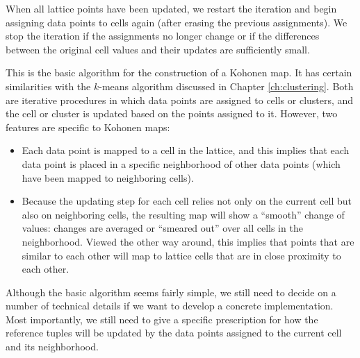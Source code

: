 When all lattice points have been updated, we restart the iteration
and begin assigning data points to cells again (after erasing the
previous assignments). We stop the iteration if the assignments no
longer change or if the differences between the original cell values
and their updates are sufficiently small.

This is the basic algorithm for the construction of a Kohonen map.  It
has certain similarities with the $k$-means algorithm discussed in
Chapter \ref{ch:clustering}. Both are iterative procedures in which
data points are assigned to cells or clusters, and the cell or cluster
is updated based on the points assigned to it.  However, two features
are specific to Kohonen maps:

\begin{itemize}
\item Each data point is mapped to a cell in the lattice, and this
  implies that each data point is placed in a specific neighborhood of
  other data points (which have been mapped to neighboring cells).
\item Because the updating step for each cell relies not only on the
  current cell but also on neighboring cells, the resulting map will
  show a ``smooth'' change of values: changes are averaged or
  ``smeared out'' over all cells in the neighborhood. Viewed the other
  way around, this implies that points that are similar to each other
  will map to lattice cells that are in close proximity to each other.
\end{itemize}

Although the basic algorithm seems fairly simple, we still need to
decide on a number of technical details if we want to develop a
concrete implementation. Most importantly, we still need to give a
specific prescription for how the reference tuples will be updated by
the data points assigned to the current cell and its neighborhood.

